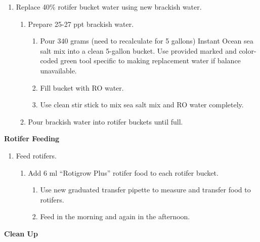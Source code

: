 \documentclass[
  letterpaper,
  DIV=11,
  numbers=noendperiod]{scrreprt}
\providecommand{\tightlist}{%
  \setlength{\itemsep}{0pt}\setlength{\parskip}{0pt}}\usepackage{longtable,booktabs,array}
\begin{document}
\begin{enumerate}
\def\labelenumi{\arabic{enumi}.}
\item
  Replace 40\% rotifer bucket water using new brackish water.

  \begin{enumerate}
  \def\labelenumii{\arabic{enumii}.}
  \tightlist
  \item
    Prepare 25-27 ppt brackish water.

    \begin{enumerate}
    \def\labelenumiii{\arabic{enumiii}.}
    \tightlist
    \item
      Pour 340 grams (need to recalculate for 5 gallons) Instant Ocean
      sea salt mix into a clean 5-gallon bucket. Use provided marked and
      color-coded green tool specific to making replacement water if
      balance unavailable.
    \item
      Fill bucket with RO water.
    \item
      Use clean stir stick to mix sea salt mix and RO water completely.
    \end{enumerate}
  \item
    Pour brackish water into rotifer buckets until full.
  \end{enumerate}
\end{enumerate}

\textbf{Rotifer Feeding}

\begin{enumerate}
\def\labelenumi{\arabic{enumi}.}
\tightlist
\item
  Feed rotifers.

  \begin{enumerate}
  \def\labelenumii{\arabic{enumii}.}
  \tightlist
  \item
    Add 6 ml ``Rotigrow Plus'' rotifer food to each rotifer bucket.

    \begin{enumerate}
    \def\labelenumiii{\arabic{enumiii}.}
    \tightlist
    \item
      Use new graduated transfer pipette to measure and transfer food to
      rotifers.
    \item
      Feed in the morning and again in the afternoon.
    \end{enumerate}
  \end{enumerate}
\end{enumerate}

\textbf{Clean Up}
\end{document}
